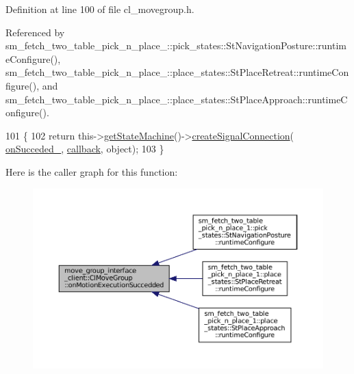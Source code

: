 Definition at line 100 of file cl\+\_\+movegroup.\+h.



Referenced by sm\+\_\+fetch\+\_\+two\+\_\+table\+\_\+pick\+\_\+n\+\_\+place\+\_\+::pick\+\_\+states\+::\+St\+Navigation\+Posture\+::runtime\+Configure(), sm\+\_\+fetch\+\_\+two\+\_\+table\+\_\+pick\+\_\+n\+\_\+place\+\_\+::place\+\_\+states\+::\+St\+Place\+Retreat\+::runtime\+Configure(), and sm\+\_\+fetch\+\_\+two\+\_\+table\+\_\+pick\+\_\+n\+\_\+place\+\_\+::place\+\_\+states\+::\+St\+Place\+Approach\+::runtime\+Configure().


\begin{DoxyCode}
101   \{
102     \textcolor{keywordflow}{return} this->\hyperlink{classsmacc_1_1ISmaccClient_aec51d4712404cb9882b86e4c854bb93a}{getStateMachine}()->\hyperlink{classsmacc_1_1ISmaccStateMachine_adf0f42ade0c65cc471960fe2a7c42da2}{createSignalConnection}(
      \hyperlink{classmove__group__interface__client_1_1ClMoveGroup_ac82aa6c44468e8035ff5df6d74746b88}{onSucceded\_}, \hyperlink{sm__ridgeback__barrel__search__1_2servers_2opencv__perception__node_2opencv__perception__node_8cpp_a050e697bd654facce10ea3f6549669b3}{callback}, \textcolor{keywordtype}{object});
103   \}
\end{DoxyCode}
Here is the caller graph for this function\+:
\nopagebreak
\begin{figure}[H]
\begin{center}
\leavevmode
\includegraphics[width=350pt]{classmove__group__interface__client_1_1ClMoveGroup_a04f3cafe060033b66f3fac27f744a043_icgraph}
\end{center}
\end{figure}
\mbox{\label{classmove__group__interface__client_1_1ClMoveGroup_a41c0eebdb446e6fbdd17113524c34869}} 
